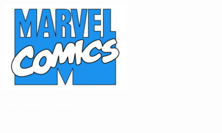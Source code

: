 \documentclass[12pt]{article}
\begin{document}
\begin{center}
  \vspace*{4cm}

  \includegraphics[width=0.5\textwidth]{90s_marvel_logo.jpg} \\[2cm]

  {\Huge\bfseries\textcolor{white}{The Ultimate Marvel Reading Order}}\\[0.5cm]
  {\Large\bfseries\textcolor{white}{New Reader’s Guide}}\\[1cm]
  {\Large\textcolor{white}{Featuring Spider-Man, X-Men, Wolverine, Daredevil, and The Punisher}}\\[2cm]
  {\large\textcolor{white}{By Arnold Sallan}}

\end{center}

\newpage
\thispagestyle{empty}
\end{document}

